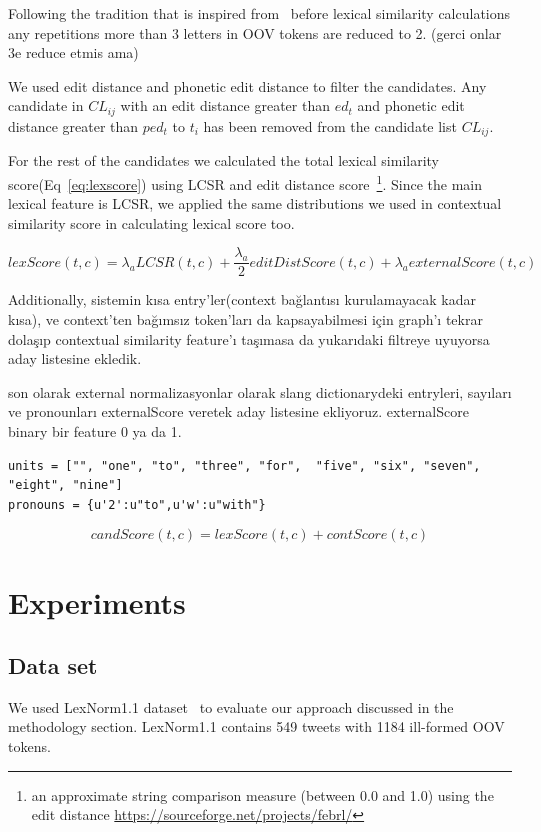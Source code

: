 \documentclass[preprint,review,12pt]{elsarticle}
\begin{document}
Following the tradition that is inspired from~\cite{Kaufmann2010} before lexical similarity calculations any repetitions more than 3 letters in OOV tokens are reduced to 2. (gerci onlar 3e reduce etmis ama)

We used edit distance and phonetic edit distance to filter the candidates. Any candidate in $CL_{ij}$ with an edit distance greater than $ed_t$ and phonetic edit distance greater than $ped_t$ to $t_i$ has been removed from the candidate list $CL_{ij}$.

For the rest of the candidates we calculated the total lexical similarity score(Eq~\ref{eq:lexscore}) using LCSR and edit distance score~\footnote{an approximate string comparison measure (between 0.0 and 1.0) using the edit distance \url{https://sourceforge.net/projects/febrl/}}. Since the main lexical feature is LCSR, we applied the same distributions we used in contextual similarity score in calculating lexical score too.

\begin{equation}
lexScore(t,c) = \lambda_a LCSR(t,c) + \frac{\lambda_a} 2 editDistScore(t,c) + \lambda_a externalScore(t,c)
\label{eq:lexscore}
\end{equation}

Additionally, sistemin kısa entry'ler(context bağlantısı kurulamayacak kadar kısa), ve context'ten bağımsız token'ları da kapsayabilmesi için graph'ı tekrar dolaşıp contextual similarity feature'ı taşımasa da yukarıdaki filtreye uyuyorsa aday listesine ekledik.


son olarak external normalizasyonlar olarak slang dictionarydeki entryleri, sayıları ve pronounları externalScore veretek aday listesine ekliyoruz. externalScore binary bir feature 0 ya da 1.
\begin{verbatim}
units = ["", "one", "to", "three", "for",  "five", "six", "seven", "eight", "nine"]
pronouns = {u'2':u"to",u'w':u"with"}
\end{verbatim}


\begin{equation}
candScore(t,c) = lexScore(t,c) + contScore(t,c)
\label{eq:candscore}
\end{equation}

\section{Experiments}
\label{sec:experiments}

\subsection{Data set}
We used LexNorm1.1 dataset~\cite{Han:2011:LNS:2002472.2002520} to evaluate our approach discussed in the methodology section. LexNorm1.1 contains 549 tweets with 1184 ill-formed OOV tokens.
\end{document}
